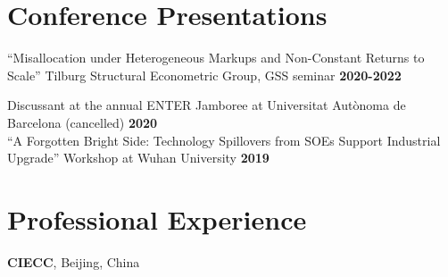 \documentclass[margin,line]{res}
\newenvironment{list2}{
  \begin{list}{$\bullet$}{%
      \setlength{\itemsep}{0in}
      \setlength{\parsep}{0in} \setlength{\parskip}{0in}
      \setlength{\topsep}{0in} \setlength{\partopsep}{0in} 
      \setlength{\leftmargin}{0.2in}}}{\end{list}}
\begin{document}
\begin{resume}
%

\section{\sc Conference Presentations}
``Misallocation under Heterogeneous Markups and Non-Constant Returns to Scale''
Tilburg Structural Econometric Group, GSS seminar \hfill {\bf 2020-2022}
\vspace{-.3cm}

Discussant at the annual ENTER Jamboree at Universitat Aut\`onoma de Barcelona (cancelled) \hfill {\bf 2020}
\vspace{-.3cm}\\


``A Forgotten Bright Side: Technology Spillovers from SOEs Support
Industrial Upgrade'' Workshop at Wuhan University \hfill {\bf 2019}

\section{\sc Professional Experience}
{\bf CIECC}, Beijing, China


\end{resume}
\end{document}

